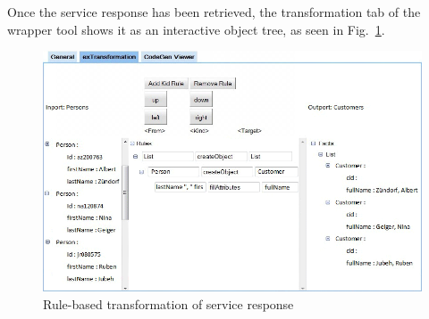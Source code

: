 % 
% 





Once the service response has been retrieved, the transformation tab of the wrapper tool shows it as an interactive object tree, as seen in Fig.~\ref{fig:response_service_execution}. 

\begin{figure}
  \begin{center}     
    \includegraphics[width=\linewidth]{images/ServiceWrapperToolGVSWithTransformationRules-HQ.png}
    \caption{Rule-based transformation of service response}
    \label{fig:response_service_execution}
  \end{center}
\end{figure}

